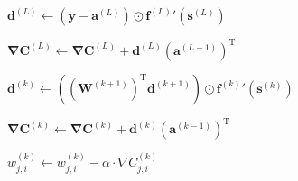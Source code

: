 \documentclass{article}
\begin{document}
      \begin{algorithm}
        \caption{%
          Algorithm \ref{algadjustgradient} with matrix-vector notation.
        }
        \begin{algorithmic}
            \State $
              \mathbf{d}^{(L)} \gets
                \left( \mathbf{y} - \mathbf{a}^{(L)} \right)
                \odot
                {\mathbf{f}^{(L)}}' \left( \mathbf{s}^{(L)} \right)
            $

            \State $
              \mathbf{\nabla C}^{(L)} \gets
                \mathbf{\nabla C}^{(L)}
                +
                \mathbf{d}^{(L)} \left( \mathbf{a}^{(L-1)} \right)^\mathrm{T}
            $ 

              \State $
                \mathbf{d}^{(k)} \gets
                  \left(
                    \left( \mathbf{W}^{(k+1)} \right)^\mathrm{T}
                    \mathbf{d}^{(k+1)}
                  \right)
                  \odot
                  {\mathbf{f}^{(k)}}' \left( \mathbf{s}^{(k)} \right)
              $

              \State $
                \mathbf{\nabla C}^{(k)} \gets
                  \mathbf{\nabla C}^{(k)}
                  +
                  \mathbf{d}^{(k)} \left( \mathbf{a}^{(k-1)} \right)^\mathrm{T}
              $ 
            \EndFor
          \EndProcedure
        \end{algorithmic}
      \end{algorithm}

      \begin{algorithm}
        \caption{%
          Adjust the weights and biases of the network with the gradient of the
          current batch and the given learning rate.
        } \label{algadjustweights}
        \begin{algorithmic}
                  \State $
                    w_{j,i}^{(k)} \gets
                      w_{j,i}^{(k)} - \alpha \cdot \nabla C_{j,i}^{(k)}
                  $
                \EndFor
              \EndFor
            \EndFor
          \EndProcedure
        \end{algorithmic}
      \end{algorithm}
\end{document}
